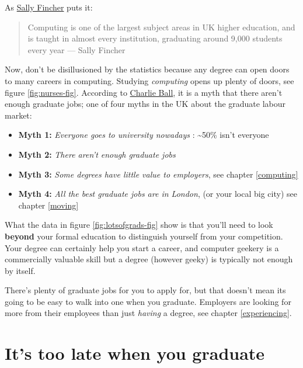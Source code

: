 \documentclass[
]{book}
\providecommand{\tightlist}{%
  \setlength{\itemsep}{0pt}\setlength{\parskip}{0pt}}
\begin{document}
As \href{https://en.wikipedia.org/wiki/Sally_Fincher}{Sally Fincher} puts it:

\begin{quote}
Computing is one of the largest subject areas in UK higher education, and is taught in almost every institution, graduating around 9,000 students every year
\hfill --- Sally Fincher \citep{fincherreview}
\end{quote}

Now, don't be disillusioned by the statistics because any degree can open doors to many careers in computing. Studying \emph{computing} opens up plenty of doors, see figure \ref{fig:nurses-fig}. According to \href{https://twitter.com/lmicharlie}{Charlie Ball}, it is a myth that there aren't enough graduate jobs; one of four myths in the UK about the graduate labour market:

\begin{itemize}
\tightlist
\item
  \textbf{Myth 1:} \emph{Everyone goes to university nowadays} : \textasciitilde50\% isn't everyone \citep{ballmyths}
\item
  \textbf{Myth 2:} \emph{There aren't enough graduate jobs} \citep{ballmyths}
\item
  \textbf{Myth 3:} \emph{Some degrees have little value to employers}, see chapter \ref{computing}
\item
  \textbf{Myth 4:} \emph{All the best graduate jobs are in London}, (or your local big city) see chapter \ref{moving}
\end{itemize}

What the data in figure \ref{fig:lotsofgrads-fig} show is that you'll need to look \textbf{beyond} your formal education to distinguish yourself from your competition. Your degree can certainly help you start a career, and computer geekery is a commercially valuable skill but a degree (however geeky) is typically not enough by itself.

There's plenty of graduate jobs for you to apply for, but that doesn't mean its going to be easy to walk into one when you graduate. Employers are looking for more from their employees than just \emph{having} a degree, see chapter \ref{experiencing}.

\hypertarget{thisstuffmatters}{%
\section{It's too late when you graduate}\label{thisstuffmatters}}
\end{document}
